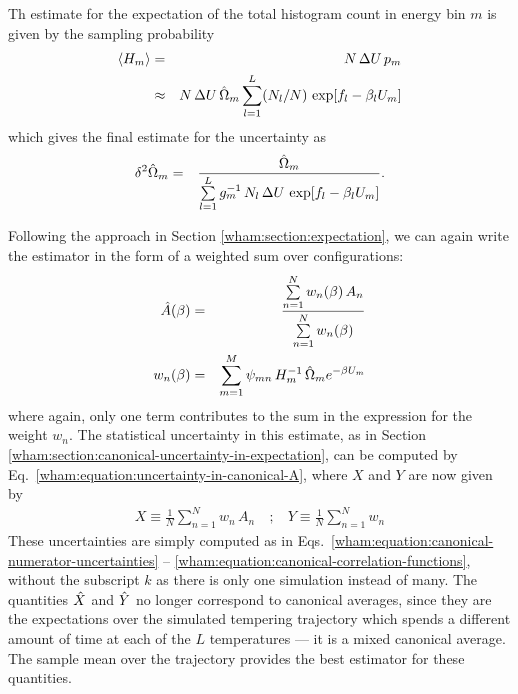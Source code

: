 Th estimate for the expectation of the total histogram count in energy bin $m$ is given by the sampling probability
\begin{eqnarray}
\langle H_m \rangle &=& N \, \Delta U \, p_m \nonumber \\
&\approx& N \, \Delta U \, \hat{\Omega}_m \sum_{l = 1}^L (N_l / N) \, \exp[f_l - \beta_l U_m]
\end{eqnarray}
which gives the final estimate for the uncertainty as
\begin{eqnarray}
\delta^2 \hat{\Omega}_m &=& \frac{\hat{\Omega}_m}{\sum\limits_{l=1}^L g_m^{-1} \, N_l \, \Delta U \, \exp[f_l - \beta_l U_m]} . \label{wham:equation:simulated-tempering-dos-uncertainty}
\end{eqnarray}

Following the approach in Section \ref{wham:section:expectation}, we can again write the estimator in the form of a weighted sum over configurations:
\begin{eqnarray}
\hat{A}(\beta) &=& \frac{\sum\limits_{n=1}^N w_n(\beta) \, A_n}{\sum\limits_{n=1}^N w_n(\beta)} \label{wham:equation:simulated-tempering-expectation} \\
w_n(\beta) &=& \sum_{m=1}^M \psi_{mn} \, H_m^{-1} \, \hat{\Omega}_m e^{-\beta U_m} \label{wham:equation:simulated-tempering-weights}
\end{eqnarray}
where again, only one term contributes to the sum in the expression for the weight $w_n$.  The statistical uncertainty in this estimate, as in Section \ref{wham:section:canonical-uncertainty-in-expectation}, can be computed by Eq.\ \ref{wham:equation:uncertainty-in-canonical-A}, where $X$ and $Y$ are now given by
\begin{eqnarray}
X \equiv \frac{1}{N} \sum_{n=1}^{N} w_n \, A_n \: &;& \: Y \equiv \frac{1}{N} \sum_{n=1}^{N} w_n 
\end{eqnarray}
These uncertainties are simply computed as in Eqs.\ \ref{wham:equation:canonical-numerator-uncertainties} -- \ref{wham:equation:canonical-correlation-functions}, without the subscript $k$ as there is only one simulation instead of many.  The quantities $\hat{X}$ and $\hat{Y}$ no longer correspond to canonical averages, since they are the expectations over the simulated tempering trajectory which spends a different amount of time at each of the $L$ temperatures --- it is a mixed canonical average.  The sample mean over the trajectory provides the best estimator for these quantities.

